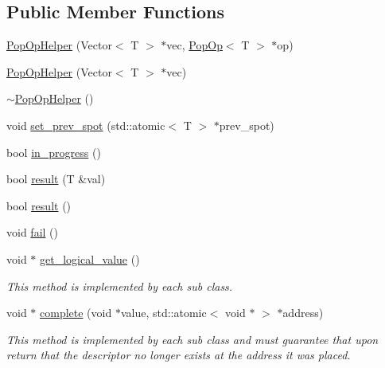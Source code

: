 \subsection*{Public Member Functions}
\begin{DoxyCompactItemize}
\item 
\hyperlink{classtervel_1_1containers_1_1wf_1_1vector_1_1_pop_op_helper_a240a07fdf0b2b8dd83118e4561d1d503}{Pop\+Op\+Helper} (Vector$<$ T $>$ $\ast$vec, \hyperlink{classtervel_1_1containers_1_1wf_1_1vector_1_1_pop_op}{Pop\+Op}$<$ T $>$ $\ast$op)
\item 
\hyperlink{classtervel_1_1containers_1_1wf_1_1vector_1_1_pop_op_helper_a5202ccce9347631011450a59c5ccee4b}{Pop\+Op\+Helper} (Vector$<$ T $>$ $\ast$vec)
\item 
\hyperlink{classtervel_1_1containers_1_1wf_1_1vector_1_1_pop_op_helper_a2e3fa09a93946eb888c949c5104320d3}{$\sim$\+Pop\+Op\+Helper} ()
\item 
void \hyperlink{classtervel_1_1containers_1_1wf_1_1vector_1_1_pop_op_helper_a41e3e623caaa4ee222bf3caaf8b550a6}{set\+\_\+prev\+\_\+spot} (std\+::atomic$<$ T $>$ $\ast$prev\+\_\+spot)
\item 
bool \hyperlink{classtervel_1_1containers_1_1wf_1_1vector_1_1_pop_op_helper_ab415614db4dbb5e22d77e22c74fbd3ad}{in\+\_\+progress} ()
\item 
bool \hyperlink{classtervel_1_1containers_1_1wf_1_1vector_1_1_pop_op_helper_a5e9f2e1522a4b12e279d623c164ce77f}{result} (T \&val)
\item 
bool \hyperlink{classtervel_1_1containers_1_1wf_1_1vector_1_1_pop_op_helper_a7d7cee8a5eb40da290c8e3c95f324721}{result} ()
\item 
void \hyperlink{classtervel_1_1containers_1_1wf_1_1vector_1_1_pop_op_helper_ad5e86e41301c8fc8a0254daf285e023f}{fail} ()
\item 
void $\ast$ \hyperlink{classtervel_1_1containers_1_1wf_1_1vector_1_1_pop_op_helper_a0cd831d37361277e4e212e56d453dd70}{get\+\_\+logical\+\_\+value} ()
\begin{DoxyCompactList}\small\item\em This method is implemented by each sub class. \end{DoxyCompactList}\item 
void $\ast$ \hyperlink{classtervel_1_1containers_1_1wf_1_1vector_1_1_pop_op_helper_a1f92037dcfec837afe0684e119c7344f}{complete} (void $\ast$value, std\+::atomic$<$ void $\ast$ $>$ $\ast$address)
\begin{DoxyCompactList}\small\item\em This method is implemented by each sub class and must guarantee that upon return that the descriptor no longer exists at the address it was placed. \end{DoxyCompactList}\item 

\end{DoxyCompactItemize}
